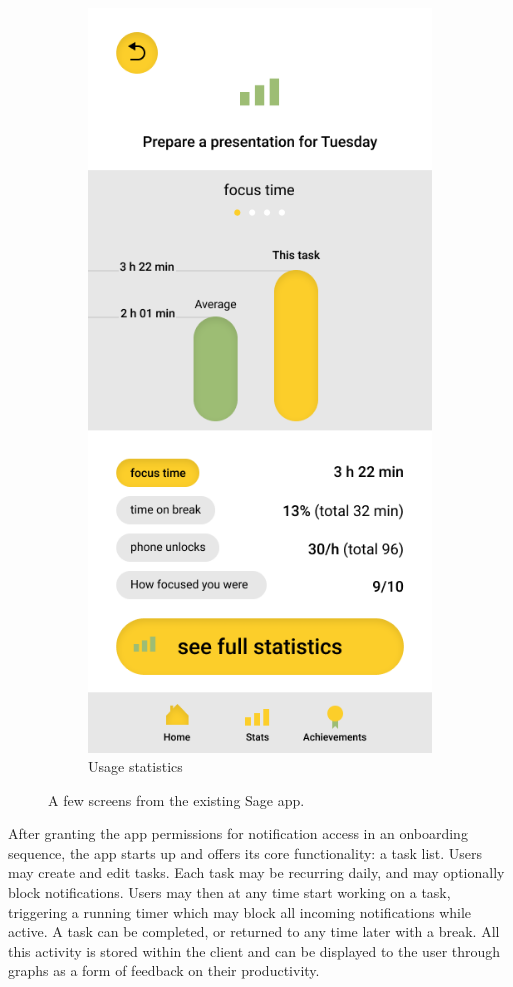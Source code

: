 \begin{figure}[htb!]
\begin{center}
\begin{subfigure}{.3\textwidth}
            \includegraphics[width=0.8\linewidth]{images/sage_statistics.png}
            \caption{Usage statistics}
            \label{fig:old_sage_stats}
        \end{subfigure}%
        \caption{A few screens from the existing Sage app.}
        \label{fig:old_sage_achievements}
    \end{center}
\end{figure}

After granting the app permissions for notification access in an onboarding sequence, the app starts up and offers its core functionality: a task list. Users may create and edit tasks. Each task may be recurring daily, and may optionally block notifications. Users may then at any time start working on a task, triggering a running timer which may block all incoming notifications while active. A task can be completed, or returned to any time later with a break. All this activity is stored within the client and can be displayed to the user through graphs as a form of feedback on their productivity.

